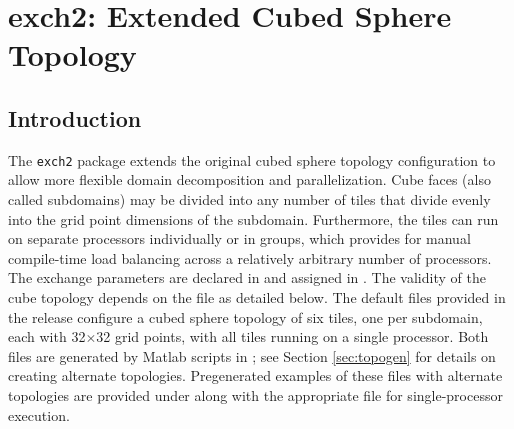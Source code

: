 


\section{exch2: Extended Cubed Sphere \mbox{Topology}}
\label{sec:exch2}


\subsection{Introduction}

The \texttt{exch2} package extends the original cubed sphere topology
configuration to allow more flexible domain decomposition and
parallelization.  Cube faces (also called subdomains) may be divided
into any number of tiles that divide evenly into the grid point
dimensions of the subdomain.  Furthermore, the tiles can run on
separate processors individually or in groups, which provides for
manual compile-time load balancing across a relatively arbitrary
number of processors. \\

The exchange parameters are declared in
and assigned in
. The
validity of the cube topology depends on the  file as
detailed below.  The default files provided in the release configure a
cubed sphere topology of six tiles, one per subdomain, each with
32$\times$32 grid points, with all tiles running on a single processor.  Both
files are generated by Matlab scripts in
; see Section
\ref{sec:topogen} 
for details on creating alternate topologies.  Pregenerated examples
of these files with alternate topologies are provided under
 along with the appropriate 
file for single-processor execution.

